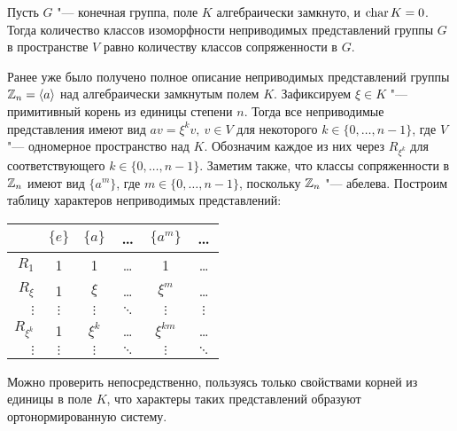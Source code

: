 \begin{corollary}
	Пусть $G$ "--- конечная группа, поле $K$ алгебраически замкнуто, и $\operatorname{char}{K} = 0$. Тогда количество классов изоморфности неприводимых представлений группы $G$ в пространстве $V$ равно количеству классов сопряженности в $G$.
\end{corollary}

\begin{example}
	Ранее уже было получено полное описание неприводимых представлений группы $\mathbb{Z}_n = \langle a \rangle$ над алгебраически замкнутым полем $K$. Зафиксируем $\xi \in K$ "--- примитивный корень из единицы степени $n$. Тогда все неприводимые представления имеют вид $av = \xi^k v,~v \in V$ для некоторого $k \in \{0, \dotsc, n - 1\}$, где $V$ "--- одномерное пространство над $K$. Обозначим каждое из них через $R_{\xi^k}$ для соответствующего $k \in \{0, \dotsc, n - 1\}$. Заметим также, что классы сопряженности в $\mathbb{Z}_n$ имеют вид $\{a^m\}$, где $m \in \{0, \dotsc, n - 1\}$, поскольку $\mathbb{Z}_n$ "--- абелева. Построим таблицу характеров неприводимых представлений:
	\begin{center}
		\begin{tabular}{r|c|c|c|c|c}
			            & $\{e\}$  & $\{a\}$  &  \dots   & $\{a^m\}$  &  \dots   \\ \hline
			   $R_1$    &    1     &    1     &  \dots   &     1      &  \dots   \\
			  $R_\xi$   &    1     &  $\xi$   &  \dots   &  $\xi^m$   &  \dots   \\
			 $\vdots$   & $\vdots$ & $\vdots$ & $\ddots$ & $\vdots $  & $\vdots$ \\
			$R_{\xi^k}$ &    1     & $\xi^k$  &  \dots   & $\xi^{km}$ &  \dots   \\
			 $\vdots$   & $\vdots$ & $\vdots$ & $\ddots$ &  $\vdots$  & $\ddots$
		\end{tabular}
	\end{center}

	Можно проверить непосредственно, пользуясь только свойствами корней из единицы в поле $K$, что характеры таких представлений образуют ортонормированную систему.
\end{example}


